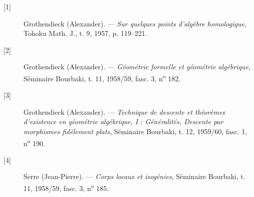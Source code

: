 \begin{description}
  \item[{[1]}] Grothendieck (Alexander). --- \emph{Sur quelques points
    d'algèbre homologique}, Tohoku Math. J., t. 9, 1957, p. 119--221.
  \item[{[2]}] Grothendieck (Alexander). --- \emph{Géométrie formelle et
    géométrie algébrique}, Séminaire Bourbaki, t. 11, 1958/59, fasc. 3,
    n\textsuperscript{o} 182.
  \item[{[3]}] Grothendieck (Alexander). --- \emph{Technique de descente et
    théorèmes d'existence en géométrie algébrique, I : Généralités, Descente
    par morphismes fidèlement plats}, Séminaire Bourbaki, t. 12, 1959/60,
    fasc. 1, n\textsuperscript{o} 190.
  \item[{[4]}] Serre (Jean-Pierre). --- \emph{Corps locaux et isogénies},
    Séminaire Bourbaki, t. 11, 1958/59, fasc. 3, n\textsuperscript{o} 185.
\end{description}

\par
